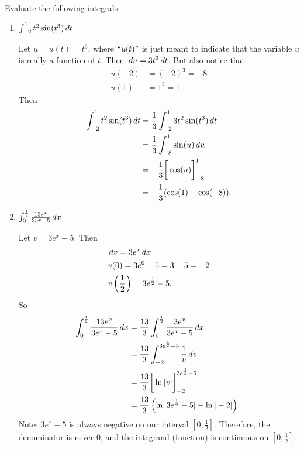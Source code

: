 \documentclass[nooutcomes]{ximera}
\begin{document}
\begin{problem}
Evaluate the following integrals:

	\begin{enumerate}

	\item  $\int_{-2}^1 t^2 \sin(t^3) \,d t$
		\begin{freeResponse}
		Let $u=u(t) = t^3$, where $``u(t)"$ is just meant to indicate that the variable $u$ is really a function of $t$.  Then $\,d u = 3t^2 \,d t$.  But also notice that
			\begin{align*}
			u(-2) &= (-2)^3 = -8  \\
			u(1) &= 1^3 = 1
			\end{align*}
		Then
			\begin{align*}
			\int_{-2}^1 t^2 \sin(t^3) \,d t &= \frac{1}{3} \int_{-2}^1 3 t^2 \sin(t^3) \,d t  \\
			&= \frac{1}{3} \int_{-8}^1 \sin(u) \,d u  \\
			&= - \frac{1}{3} \bigg[ \cos(u) \bigg]_{-8}^1  \\
			&= - \frac{1}{3} ( \cos(1) - \cos(-8)).
			\end{align*}
		\end{freeResponse}

	\item  $\int_0^{\frac{1}{2}} \frac{13e^x}{3e^x - 5} \,d x$

		\begin{freeResponse}
		Let $v=3e^x - 5$.  Then
			\begin{align*}
			&\,d v = 3e^x \,d x  \\
			&v(0) = 3e^0 -5= 3-5=-2  \\
			&v\left( \frac{1}{2} \right) = 3e^{\frac{1}{2}} - 5.
			\end{align*}
		So
			\begin{align*}
			\int_0^{\frac{1}{2}} \frac{13e^x}{3e^x - 5} \,d x &= \frac{13}{3} \int_0^{\frac{1}{2}} \frac{3e^x}{3e^x - 5} \,d x  \\
			&= \frac{13}{3} \int_{-2}^{3e^{\frac{1}{2}}-5} \frac{1}{v} \,d v  \\
			&= \frac{13}{3} \bigg[ \ln|v| \bigg]_{-2}^{3e^{\frac{1}{2}}-5}  \\
			&= \frac{13}{3} \left( \ln|3e^{\frac{1}{2}}-5| - \ln|-2| \right).  \\
			\end{align*}
		Note: $3e^x-5$ is always negative on our interval $[0,\frac{1}{2}]$.  Therefore, the denominator is never $0$, and the integrand (function) is continuous on  $[0,\frac{1}{2}]$.
		\end{freeResponse}
	\end{enumerate}
\end{problem}
\end{document}
